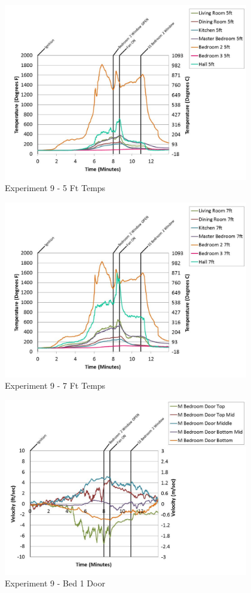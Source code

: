 \documentclass{article}
\begin{document}
\begin{appendices}
	\begin{figure}[h!]
		\centering
		\includegraphics[height=3.05in]{0_Images/Results_Charts/Exp_9_Charts/5FtTemps.pdf}
		\caption{Experiment 9 - 5 Ft Temps}
	\end{figure}
 

	\begin{figure}[h!]
		\centering
		\includegraphics[height=3.05in]{0_Images/Results_Charts/Exp_9_Charts/7FtTemps.pdf}
		\caption{Experiment 9 - 7 Ft Temps}
	\end{figure}
 
	\clearpage

	\begin{figure}[h!]
		\centering
		\includegraphics[height=3.05in]{0_Images/Results_Charts/Exp_9_Charts/Bed1Door.pdf}
		\caption{Experiment 9 - Bed 1 Door}
	\end{figure}
 


\end{appendices}
\end{document}
